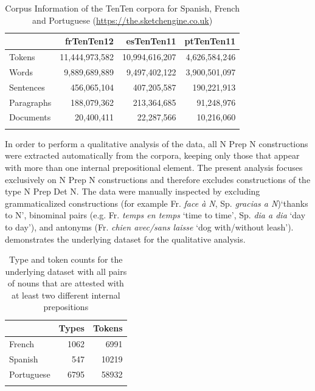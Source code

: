 \documentclass[output=paper]{langsci/langscibook}
\begin{document}
\begin{table}
\caption{Corpus Information of the TenTen corpora for Spanish, French and Portuguese (\url{https://the.sketchengine.co.uk})\label{tab:1:frequencies}}
 \begin{tabular}{lrrr} 
  \lsptoprule
            & frTenTen12 & esTenTen11 & ptTenTen11 \\ 
  \midrule
  Tokens  &   11,444,973,582 &    10,994,616,207     & 4,626,584,246\\
  Words  &   9,889,689,889 &  9,497,402,122 &    3,900,501,097\\
  Sentences  &  456,065,104 &  407,205,587 &    190,221,913\\
  Paragraphs  &  188,079,362 &  213,364,685 &    91,248,976\\
   Documents  &  20,400,411 &  22,287,566 &    10,216,060\\
  \lspbottomrule
 \end{tabular}
\end{table}


In order to perform a qualitative analysis of the data, all N Prep N constructions were extracted automatically from the corpora, keeping only those that appear with more than one internal prepositional element. The present analysis focuses exclusively on N Prep N constructions and therefore excludes constructions of the type N Prep Det N. The data were manually inspected by excluding grammaticalized constructions (for example Fr. \textit{face à N}, Sp. \textit{gracias a N})`thanks to N', binominal pairs (e.g. Fr. \textit{temps en temps} `time to time', Sp. \textit{dia a dia} `day to day'), and antonyms (Fr. \textit{chien avec/sans laisse} `dog with/without leash').  demonstrates the underlying dataset for the qualitative analysis.

\begin{table}
\caption{Type and token counts for the underlying dataset with all pairs of nouns that are attested with at least two different internal prepositions\label{tab:2:frequencies}}
 \begin{tabular}{lrr} 
  \lsptoprule
            & Types & Tokens \\ 
  \midrule
  French  &   1062 &    6991     \\
  Spanish  &  547 &  10219 \\
  Portuguese  &  6795 &  58932 \\
  \lspbottomrule
 \end{tabular}
\end{table}
\end{document}
